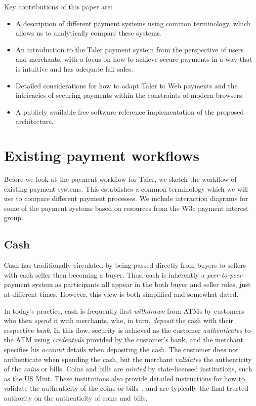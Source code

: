 \documentclass{llncs}
\begin{document}
\newpage
Key contributions of this paper are:
\begin{itemize}
 \item A description of different payment systems using
  common terminology, which allows us to analytically compare
  these systems.
 \item An introduction to the Taler payment system from the
  perspective of users and merchants, with a focus on how
  to achieve secure payments in a way that is intuitive and
  has adequate fail-safes.
 \item Detailed considerations for how to adapt Taler to
  Web payments and the intricacies of securing payments
  within the constraints of modern browsers.
 \item A publicly available free software
  reference implementation of the proposed architecture.
\end{itemize}


\section{Existing payment workflows}

Before we look at the payment workflow for Taler, we sketch the
workflow of existing payment systems. This establishes a common
terminology which we will use to compare different payment processes.
We include interaction diagrams for some of the payment systems
based on resources from the W3c payment interest group.

\subsection{Cash}

Cash has traditionally circulated by being passed directly from buyers
to sellers with each seller then becoming a buyer. Thus, cash is
inherently a {\em peer-to-peer} payment system as participants all
appear in the both buyer and seller roles, just at different times.
However, this view is both simplified and
somewhat dated.

In today's practice, cash is frequently first {\em withdrawn} from
ATMs by customers who then {\em spend} it with merchants, who, in turn,
{\em deposit} the cash with their respective {\em bank}.  In this
flow, security is achieved as the customer {\em authenticates} to the
ATM using {\em credentials} provided by the customer's bank, and the
merchant specifies his {\em account} details when depositing the cash.
The customer does not authenticate when spending the cash, but the
merchant {\em validates} the authenticity of the {\em coins} or bills.
Coins and bills are {\em minted} by state-licensed institutions, such
as the US Mint.  These institutions also provide detailed instructions
for how to validate the authenticity of the coins or
bills~\cite{ezb2016ourmoney}, and are typically the final trusted
authority on the authenticity of coins and bills.
\end{document}
